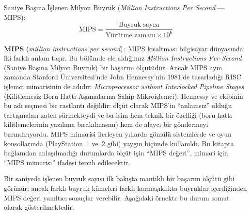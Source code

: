 Saniye Başına İşlenen Milyon Buyruk (\emph{Million Instructions Per Second} --- MIPS):
\begin{equation}
\text{MIPS} = \frac{\text{Buyruk sayısı}}{\text{Yürütme zamanı} \times 10^6}
\label{eq:mips}
\end{equation}

\begin{terimnotu}
\textbf{MIPS} (\emph{million instructions per second})\,: MIPS kısaltması bilgisayar dünyasında iki farklı anlam taşır. Bu bölümde ele aldığımız \emph{Million Instructions Per Second} (Saniye Başına Milyon Buyruk) bir başarım ölçütüdür. Ancak MIPS aynı zamanda Stanford Üniversitesi'nde John Hennessy'nin 1981'de tasarladığı RISC işlemci mimarisinin de adıdır: \emph{Microprocessor without Interlocked Pipeline Stages} (Kilitlemesiz Boru Hattı Aşamalarına Sahip Mikroişlemci). Hennessy ve ekibinin bu adı seçmesi bir rastlantı değildir: ölçüt olarak MIPS'in ``anlamsız'' olduğu tartışmaları zaten sürmekteydi ve bu isim hem teknik bir özelliği (boru hattı kilitlemelerinin yazılıma bırakılmasını) hem de alaycı bir göndermeyi barındırıyordu. MIPS mimarisi ilerleyen yıllarda gömülü sistemlerde ve oyun konsollarında (PlayStation~1 ve~2 gibi) yaygın biçimde kullanıldı. Bu kitapta bağlamdan anlaşılmadığı durumlarda ölçüt için ``MIPS değeri'', mimari için ``MIPS mimarisi'' ifadesi tercih edilecektir.
\end{terimnotu}

Bir saniyede işlenen buyruk sayısı ilk bakışta mantıklı bir başarım ölçütü gibi görünür; ancak farklı buyruk kümeleri farklı karmaşıklıkta buyruklar içerdiğinden MIPS değeri yanıltıcı sonuçlar verebilir. Aşağıdaki örnekte bu durum somut olarak gösterilmektedir.


